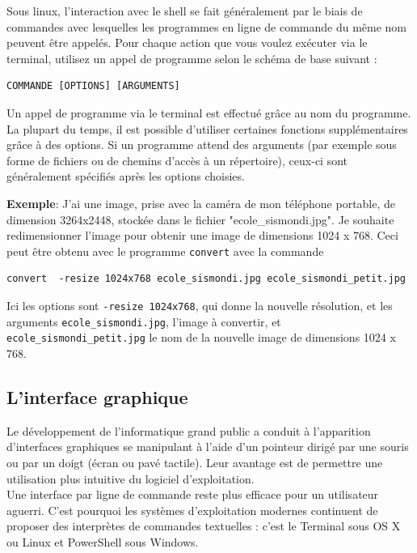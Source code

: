 \begin{eclairage}
	Sous linux, l’interaction avec le shell se fait généralement par le biais de commandes avec lesquelles les programmes en ligne de commande du même nom peuvent être appelés. Pour chaque action que vous voulez exécuter via le terminal, utilisez un appel de programme selon le schéma de base suivant :
	\begin{lstlisting}[numbers=none]
COMMANDE [OPTIONS] [ARGUMENTS]
	\end{lstlisting}
	Un appel de programme via le terminal est effectué grâce au nom du programme. La plupart du temps, il est possible d’utiliser certaines fonctions supplémentaires grâce à des options. Si un programme attend des arguments (par exemple sous forme de fichiers ou de chemins d’accès à un répertoire), ceux-ci sont généralement spécifiés après les options choisies.\newline \newline
	
	\textbf{Exemple}: J'ai une image, prise avec la caméra de mon téléphone portable, de dimension 3264x2448, stockée dans le fichier "ecole\_sismondi.jpg". Je souhaite redimensionner l'image pour obtenir une image de dimensions 1024 x 768. Ceci peut être obtenu avec le programme \lstinline{convert} avec la commande
	\begin{lstlisting}[numbers=none]
convert  -resize 1024x768 ecole_sismondi.jpg ecole_sismondi_petit.jpg
	\end{lstlisting}	
	Ici les options sont \lstinline{-resize 1024x768}, qui donne la nouvelle résolution, et les arguments \lstinline{ecole_sismondi.jpg}, l'image à convertir, et \lstinline{ecole_sismondi_petit.jpg} le nom de la nouvelle image de dimensions 1024 x 768.
\end{eclairage}	


\subsection{L'interface graphique}
Le développement de l’informatique grand public a conduit à l’apparition d’interfaces graphiques se manipulant à l’aide d’un pointeur dirigé par une souris ou par un doigt (écran ou pavé tactile). Leur avantage est de permettre une utilisation plus intuitive du logiciel d’exploitation.\\

Une interface par ligne de commande reste plus efficace pour un utilisateur aguerri. C’est pourquoi les systèmes d’exploitation modernes continuent de proposer des interprètes de commandes textuelles : c’est le Terminal sous OS X ou Linux et PowerShell sous Windows.


